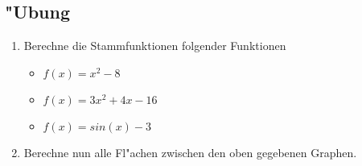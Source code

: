\subsection{"Ubung}
\begin{enumerate}
\item Berechne die Stammfunktionen folgender Funktionen
\begin{itemize}
\item $f(x)=x^2-8$
\item $f(x)=3x^2+4x-16$
\item $f(x)=sin(x)-3$
\end{itemize}
\item Berechne nun alle Fl"achen zwischen den oben gegebenen Graphen.
\end{enumerate}